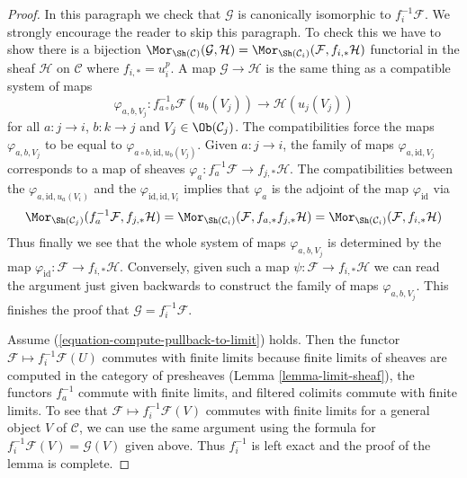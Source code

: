 \begin{proof}
\medskip\noindent
In this paragraph we check that $\mathcal{G}$ is canonically isomorphic to
$f_i^{-1}\mathcal{F}$. We strongly encourage the reader to skip this paragraph.
To check this we have to show there is a bijection
$\Mor_{\Sh(\mathcal{C})}(\mathcal{G}, \mathcal{H}) =
\Mor_{\Sh(\mathcal{C}_i)}(\mathcal{F}, f_{i, *}\mathcal{H})$
functorial in the sheaf $\mathcal{H}$ on $\mathcal{C}$
where $f_{i, *} = u_i^p$. A map
$\mathcal{G} \to \mathcal{H}$ is the same thing as a compatible
system of maps
$$
\varphi_{a, b, V_j} :
f_{a \circ b}^{-1}\mathcal{F}(u_b(V_j))
\longrightarrow
\mathcal{H}(u_j(V_j))
$$
for all $a : j \to i$, $b : k \to j$ and $V_j \in \Ob(\mathcal{C}_j)$.
The compatibilities force the maps $\varphi_{a, b, V_j}$ to be equal
to $\varphi_{a \circ b, \text{id}, u_b(V_j)}$. Given $a : j \to i$, the
family of maps $\varphi_{a, \text{id}, V_j}$ corresponds to a map
of sheaves $\varphi_a : f_a^{-1}\mathcal{F} \to f_{j, *}\mathcal{H}$.
The compatibilities between the $\varphi_{a, \text{id}, u_a(V_i)}$
and the $\varphi_{\text{id}, \text{id}, V_i}$ implies that $\varphi_a$
is the adjoint of the map $\varphi_{\text{id}}$ via
$$
\Mor_{\Sh(\mathcal{C}_j)}(f_a^{-1}\mathcal{F}, f_{j, *}\mathcal{H}) =
\Mor_{\Sh(\mathcal{C}_i)}(\mathcal{F}, f_{a, *}f_{j, *}\mathcal{H}) =
\Mor_{\Sh(\mathcal{C}_i)}(\mathcal{F}, f_{i, *}\mathcal{H})
$$
Thus finally we see that the whole system of maps $\varphi_{a, b, V_j}$
is determined by the map $\varphi_{\text{id}} : \mathcal{F} \to f_{i, *}\mathcal{H}$.
Conversely, given such a map $\psi : \mathcal{F} \to f_{i, *}\mathcal{H}$
we can read the argument just given backwards to construct the family
of maps $\varphi_{a, b, V_j}$. This finishes the proof that
$\mathcal{G} = f_i^{-1}\mathcal{F}$.

\medskip\noindent
Assume (\ref{equation-compute-pullback-to-limit}) holds. Then the functor
$\mathcal{F} \mapsto f_i^{-1}\mathcal{F}(U)$ commutes with finite limits
because finite limits of sheaves are computed in the category of presheaves
(Lemma \ref{lemma-limit-sheaf}), the functors $f_a^{-1}$ commute with finite
limits, and filtered colimits commute with finite limits. To see that
$\mathcal{F} \mapsto f_i^{-1}\mathcal{F}(V)$ commutes with finite limits
for a general object $V$ of $\mathcal{C}$, we can use the same argument using
the formula for $f_i^{-1}\mathcal{F}(V) = \mathcal{G}(V)$ given above.
Thus $f_i^{-1}$ is left exact and the proof of the lemma is complete.
\end{proof}

